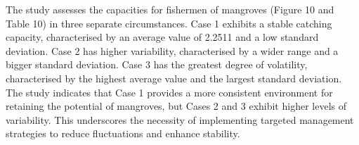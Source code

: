 \documentclass[final,5p,times,twocolumn,authoryear]{elsarticle}
\begin{document}
\begin{table}[htbp]
    \centering
    \caption{Catching Capacity Mangrove - Statistical Analysis}
\end{table}
The study assesses the capacities for fishermen of mangroves (Figure 10 and Table 10) in three separate circumstances. Case 1 exhibits a stable catching capacity, characterised by an average value of 2.2511 and a low standard deviation. Case 2 has higher variability, characterised by a wider range and a bigger standard deviation. Case 3 has the greatest degree of volatility, characterised by the highest average value and the largest standard deviation. The study indicates that Case 1 provides a more consistent environment for retaining the potential of mangroves, but Cases 2 and 3 exhibit higher levels of variability. This underscores the necessity of implementing targeted management strategies to reduce fluctuations and enhance stability.\\
\end{document}
